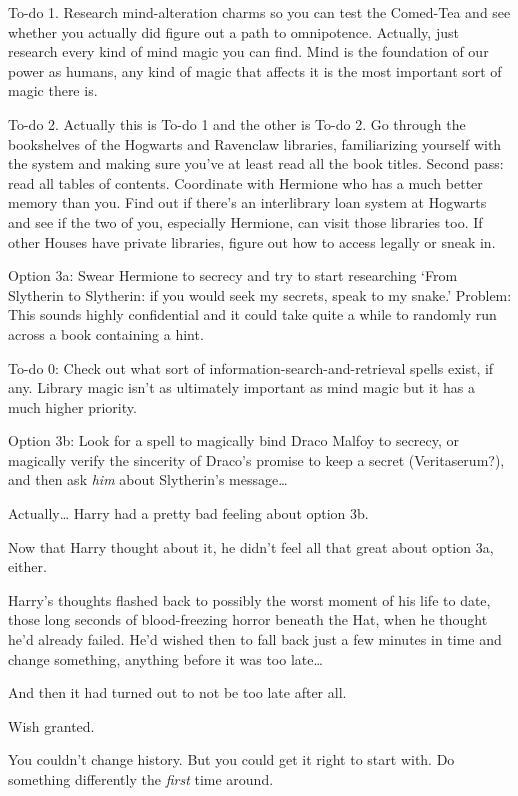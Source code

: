 \begin{em}
To-do 1. Research mind-alteration charms so you can test the Comed-Tea and see whether you actually did figure out a path to omnipotence. Actually, just research every kind of mind magic you can find. Mind is the foundation of our power as humans, any kind of magic that affects it is the most important sort of magic there is.

To-do 2. Actually this is To-do 1 and the other is To-do 2. Go through the bookshelves of the Hogwarts and Ravenclaw libraries, familiarizing yourself with the system and making sure you've at least read all the book titles. Second pass: read all tables of contents. Coordinate with Hermione who has a much better memory than you. Find out if there's an interlibrary loan system at Hogwarts and see if the two of you, especially Hermione, can visit those libraries too. If other Houses have private libraries, figure out how to access legally or sneak in.

Option 3a: Swear Hermione to secrecy and try to start researching `From Slytherin to Slytherin: if you would seek my secrets, speak to my snake.' Problem: This sounds highly confidential and it could take quite a while to randomly run across a book containing a hint.

To-do 0: Check out what sort of information-search-and-retrieval spells exist, if any. Library magic isn't as ultimately important as mind magic but it has a much higher priority.

Option 3b: Look for a spell to magically bind Draco Malfoy to secrecy, or magically verify the sincerity of Draco's promise to keep a secret (Veritaserum?), and then ask \emph{him} about Slytherin's message{\ldots}
\end{em}

Actually{\ldots} Harry had a pretty bad feeling about option 3b.

Now that Harry thought about it, he didn't feel all that great about option 3a, either.

Harry's thoughts flashed back to possibly the worst moment of his life to date, those long seconds of blood-freezing horror beneath the Hat, when he thought he'd already failed. He'd wished then to fall back just a few minutes in time and change something, anything before it was too late{\ldots}

And then it had turned out to not be too late after all.

Wish granted.

You couldn't change history. But you could get it right to start with. Do something differently the \emph{first} time around.

